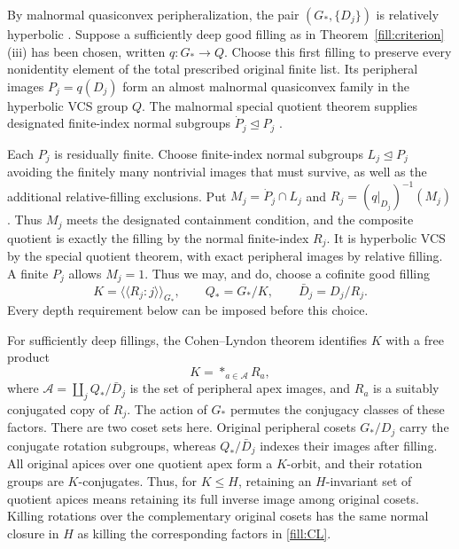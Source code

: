 By malnormal quasiconvex peripheralization, the pair
\((G_*,\{D_j\})\) is relatively hyperbolic
\cite{Bowditch2012,Osin2006}.  Suppose a sufficiently deep good filling as in
Theorem~\ref{fill:criterion}(iii) has been chosen, written
$q:G_*\to Q$. Choose this first filling to preserve every nonidentity
element of the total prescribed original finite list. Its peripheral
images $P_j=q(D_j)$ form an almost malnormal quasiconvex family in the
hyperbolic VCS group $Q$. The malnormal special quotient theorem supplies
designated finite-index normal subgroups $\dot P_j\unlhd P_j$
\cite[Theorem~2.7 and Corollary~2.8]{AGM2016}.

Each $P_j$ is residually finite. Choose finite-index normal subgroups
$L_j\unlhd P_j$ avoiding the finitely many nontrivial images that must
survive, as well as the additional relative-filling exclusions. Put
$M_j=\dot P_j\cap L_j$ and $R_j=(q|_{D_j})^{-1}(M_j)$.
Thus $M_j$ meets the designated containment condition, and the composite
quotient is exactly the filling by the normal finite-index $R_j$.
It is hyperbolic VCS by the special quotient theorem, with exact
peripheral images by relative filling. A finite $P_j$ allows $M_j=1$.
Thus we may, and do, choose a
cofinite good filling
\begin{equation}
 K=\langle\!\langle R_j:j\rangle\!\rangle_{G_*},
 \qquad Q_*=G_*/K,\qquad \bar D_j=D_j/R_j.
 \label{fill:cofinite}
\end{equation}
Every depth requirement below can be imposed before this choice.

For sufficiently deep fillings, the Cohen--Lyndon theorem
\cite[Definition~3.13 and Theorem~5.1]{Sun2020} identifies \(K\) with a free product
\begin{equation}
 K=\mathop{*}_{a\in\mathcal A} R_a,
 \label{fill:CL}
\end{equation}
where \(\mathcal A=\coprod_j Q_*/\bar D_j\) is the set of peripheral apex
images, and \(R_a\) is a suitably conjugated copy of \(R_j\).
The action of \(G_*\) permutes the conjugacy classes of these factors.
There are two coset sets here. Original peripheral cosets \(G_*/D_j\)
carry the conjugate rotation subgroups, whereas \(Q_*/\bar D_j\)
indexes their images after filling. All original apices over one
quotient apex form a \(K\)-orbit, and their rotation groups are
\(K\)-conjugates. Thus, for \(K\le H\), retaining an \(H\)-invariant
set of quotient apices means retaining its full inverse image among
original cosets. Killing rotations over the complementary original
cosets has the same normal closure in \(H\) as killing the corresponding
factors in \eqref{fill:CL}.

